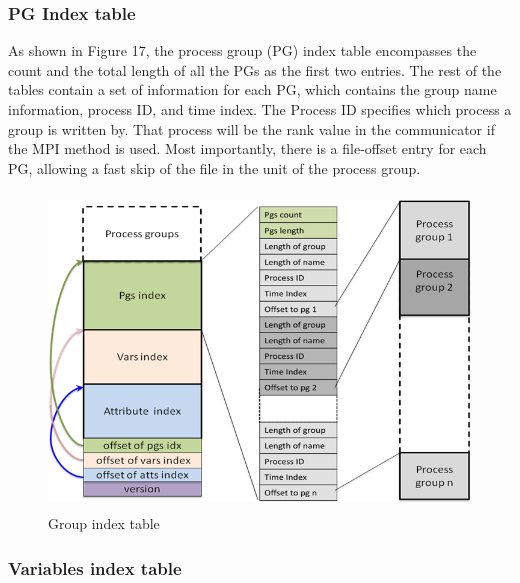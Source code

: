 \subsubsection{PG Index table}

As shown in Figure 17, the process group (PG) index table encompasses the count 
and the total length of all the PGs as the first two entries. The rest of the tables 
contain a set of information for each PG, which contains the group name information, 
process ID, and time index. The Process ID specifies which process a group is written 
by. That process will be the rank value in the communicator if the MPI method is 
used. Most importantly, there is a file-offset entry for each PG, allowing a fast 
skip of the file in the unit of the process group.

\begin{figure}[htbp]
\begin{center}
\includegraphics[width=338pt, height=238pt]{ADIOS-Manual-fig030.png}
\caption{Group index table}
\end{center}
\end{figure}\label{HRef119578810}\label{HToc144350176}

\subsubsection{Variables index table}

